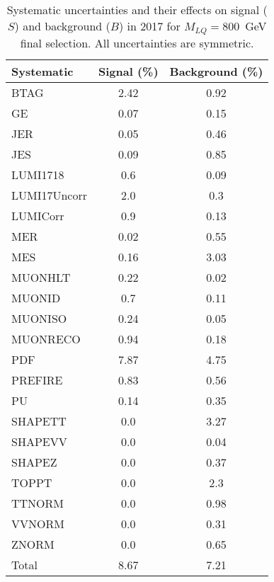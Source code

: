\begin{table}[htbp]
\begin{center}
\caption{Systematic uncertainties and their effects on signal ($S$) and background ($B$) in 2017 for $M_{LQ}=800$~GeV final selection. All uncertainties are symmetric.}
\begin{tabular}{lcc}
\hline\hline
Systematic & Signal (\%) & Background (\%) \\ \hline 
BTAG & 2.42 & 0.92\\ 
GE & 0.07 & 0.15\\ 
JER & 0.05 & 0.46\\ 
JES & 0.09 & 0.85\\ 
LUMI1718 & 0.6 & 0.09\\ 
LUMI17Uncorr & 2.0 & 0.3\\ 
LUMICorr & 0.9 & 0.13\\ 
MER & 0.02 & 0.55\\ 
MES & 0.16 & 3.03\\ 
MUONHLT & 0.22 & 0.02\\ 
MUONID & 0.7 & 0.11\\ 
MUONISO & 0.24 & 0.05\\ 
MUONRECO & 0.94 & 0.18\\ 
PDF & 7.87 & 4.75\\ 
PREFIRE & 0.83 & 0.56\\ 
PU & 0.14 & 0.35\\ 
SHAPETT & 0.0 & 3.27\\ 
SHAPEVV & 0.0 & 0.04\\ 
SHAPEZ & 0.0 & 0.37\\ 
TOPPT & 0.0 & 2.3\\ 
TTNORM & 0.0 & 0.98\\ 
VVNORM & 0.0 & 0.31\\ 
ZNORM & 0.0 & 0.65\\ 
Total & 8.67 & 7.21\\ \hline \hline
\end{tabular}
\label{tab:SysUncertainties_uujj_800}
\end{center}
\end{table}

